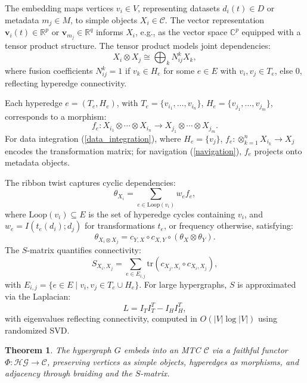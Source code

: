 \documentclass{amsart}
\newtheorem{thm}{Theorem}
\newcommand\R{\mathbb R}
\newcommand\C{\mathbb C}
\newcommand\bv{\mathbf v}
\begin{document}
The embedding maps vertices \( v_i \in V \), representing datasets \( d_i(t) \in D \) or metadata \( m_j \in M \), to simple objects \( X_i \in \mathcal{C} \). The vector representation \( \bv_i(t) \in \R^p \) or \( \bv_{m_j} \in \R^q \) informs \( X_i \), e.g., as the vector space \( \C^p \) equipped with a tensor product structure. The tensor product models joint dependencies:
\[
X_i \otimes X_j \cong \bigoplus_k N_{ij}^k X_k,
\]
where fusion coefficients \( N_{ij}^k = 1 \) if \( v_k \in H_e \) for some \( e \in E \) with \( v_i, v_j \in T_e \), else 0, reflecting hyperedge connectivity.

Each hyperedge \( e = (T_e, H_e) \), with \( T_e = \{v_{i_1}, \dots, v_{i_n}\} \), \( H_e = \{v_{j_1}, \dots, v_{j_m}\} \), corresponds to a morphism:
\[
f_e: X_{i_1} \otimes \cdots \otimes X_{i_n} \to X_{j_1} \otimes \cdots \otimes X_{j_m}.
\]
%
For data integration (\cref{data_integration}), where \( H_e = \{v_j\} \), \( f_e: \otimes_{k=1}^n X_{i_k} \to X_j \) encodes the transformation matrix; for navigation (\cref{navigation}), \( f_e \) projects onto metadata objects.

The ribbon twist captures cyclic dependencies:
\[
\theta_{X_i} = \sum_{e \in \text{Loop}(v_i)} w_e f_e,
\]
where \( \text{Loop}(v_i) \subseteq E \) is the set of hyperedge cycles containing \( v_i \), and \( w_e = I(t_e(d_i); d_j) \) for transformations \( t_e \), or frequency otherwise, satisfying:
\[
\theta_{X_i \otimes X_j} = c_{Y,X} \circ c_{X,Y} \circ (\theta_X \otimes \theta_Y).
\]
The \( S \)-matrix quantifies connectivity:
\[
S_{X_i, X_j} = \sum_{e \in E_{i,j}} \text{tr}(c_{X_j, X_i} \circ c_{X_i, X_j}),
\]
with \( E_{i,j} = \{ e \in E \mid v_i, v_j \in T_e \cup H_e \} \). For large hypergraphs, \( S \) is approximated via the Laplacian:
\[
L = I_T I_T^T - I_H I_H^T,
\]
with eigenvalues reflecting connectivity, computed in \( O(|V| \log |V|) \) using randomized SVD.

\begin{thm} \label{thm:mtc_embedding}
The hypergraph \( G \) embeds into an MTC \( \mathcal{C} \) via a faithful functor \( \Phi: \mathcal{HG} \to \mathcal{C} \), preserving vertices as simple objects, hyperedges as morphisms, and adjacency through braiding and the \( S \)-matrix.
\end{thm}
\end{document}

